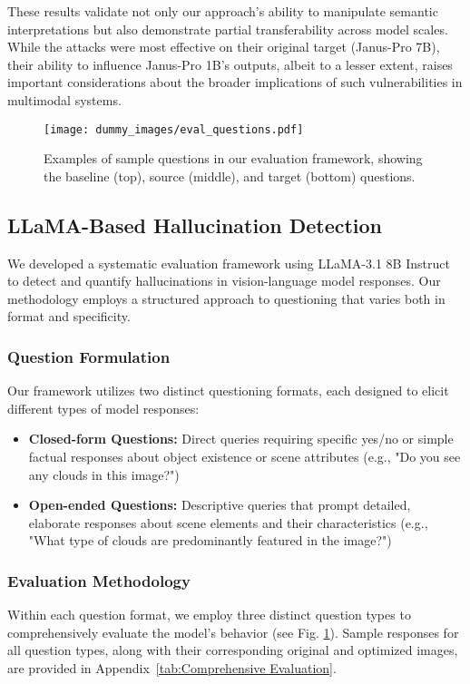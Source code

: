\documentclass[runningheads]{llncs}
\begin{document}
These results validate not only our approach's ability to manipulate semantic interpretations but also demonstrate partial transferability across model scales. While the attacks were most effective on their original target (Janus-Pro 7B), their ability to influence Janus-Pro 1B's outputs, albeit to a lesser extent, raises important considerations about the broader implications of such vulnerabilities in multimodal systems.

\begin{figure}[ht!]
\centering
\texttt{[image: dummy\_images/eval\_questions.pdf]}
\caption{Examples of sample questions in our evaluation framework, showing the baseline (top), source (middle), and target (bottom) questions.}
\label{fig:eval_questions}
\end{figure}

\subsection{LLaMA-Based Hallucination Detection}
We developed a systematic evaluation framework using LLaMA-3.1 8B Instruct to detect and quantify hallucinations in vision-language model responses. Our methodology employs a structured approach to questioning that varies both in format and specificity.

\subsubsection{Question Formulation}
Our framework utilizes two distinct questioning formats, each designed to elicit different types of model responses:

\begin{itemize}
    \item \textbf{Closed-form Questions:} Direct queries requiring specific yes/no or simple factual responses about object existence or scene attributes (e.g., "Do you see any clouds in this image?")
    \item \textbf{Open-ended Questions:} Descriptive queries that prompt detailed, elaborate responses about scene elements and their characteristics (e.g., "What type of clouds are predominantly featured in the image?")
\end{itemize}

\subsubsection{Evaluation Methodology}
Within each question format, we employ three distinct question types to comprehensively evaluate the model's behavior (see Fig. \ref{fig:eval_questions}). Sample responses for all question types, along with their corresponding original and optimized images, are provided in Appendix~\ref{tab:Comprehensive Evaluation}.
\end{document}
